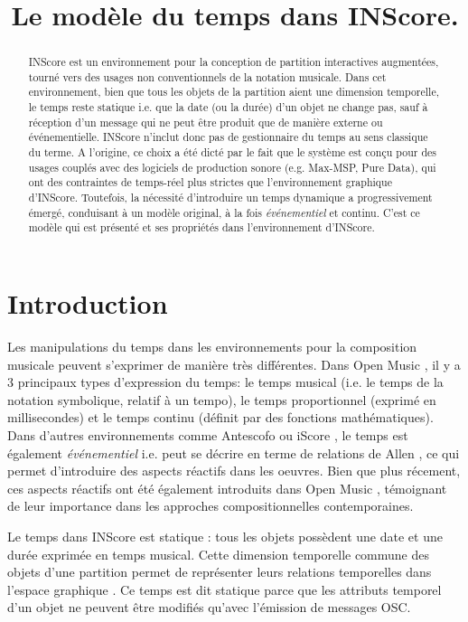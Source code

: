 \documentclass{article}
\title{Le modèle du temps dans INScore.}
\begin{document}
%
\maketitle
%
\begin{abstract}
INScore est un environnement pour la conception de partition interactives augmentées, tourné vers des usages non conventionnels de la notation musicale. Dans cet environnement, bien que tous les objets de la partition aient une dimension temporelle, le temps reste statique i.e. que la date (ou la durée) d'un objet ne change pas, sauf à réception d'un message qui ne peut être produit que de manière externe ou événementielle. INScore n'inclut donc pas de gestionnaire du temps au sens classique du terme. 
A l'origine, ce choix a été dicté par le fait que le système est conçu pour des usages couplés avec des logiciels de production sonore (e.g. Max-MSP, Pure Data), qui ont des contraintes de temps-réel plus strictes que l'environnement graphique d'INScore.
Toutefois, la nécessité d'introduire un temps dynamique a progressivement émergé, conduisant à un modèle original, à la fois \emph{événementiel} et continu. C'est ce modèle qui est présenté et ses propriétés dans l'environnement d'INScore.
\end{abstract}

\section{Introduction}\label{sec:introduction}

Les manipulations du temps dans les environnements pour la composition musicale peuvent s'exprimer de manière très différentes.
Dans Open Music \cite{bresson08}, il y a 3 principaux types d'expression du temps: le temps musical (i.e. le temps de la notation symbolique, relatif à un tempo), le temps proportionnel (exprimé en millisecondes) et le temps continu (définit par des fonctions mathématiques). 
Dans d'autres environnements comme Antescofo \cite{acont08} ou iScore \cite{AllombertDA08}, le temps est également \textit{événementiel} i.e. peut se décrire en terme de relations de Allen \cite{Allen:1983:MKT:182.358434}, ce qui permet d'introduire des aspects réactifs dans les oeuvres. 
Bien que plus récement, ces aspects réactifs ont été également introduits dans Open Music \cite{bresson:hal-00965747}, témoignant de leur importance dans les approches compositionnelles contemporaines.

Le temps dans INScore \cite{Fober:12a} est statique : tous les objets possèdent une date et une durée exprimée en temps musical. Cette dimension temporelle commune des objets d'une partition  permet de représenter leurs relations temporelles dans l'espace graphique \cite{fober:10b}. Ce temps est dit statique parce que les attributs temporel d'un objet ne peuvent être modifiés qu'avec l'émission de messages OSC.
\end{document}
